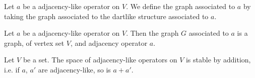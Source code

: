 \begin{definition}
  \label{def:graph_of_adjlike}
  Let $a$ be a adjacency-like operator on $V$.
  We define the graph associated to $a$ by taking the graph associated to the dartlike structure
  associated to $a$.
\end{definition}

\begin{lemma}
  \label{lem:adjacency_of_graph_of_adjacency}
  Let $a$ be a adjacency-like operator on $V$.
  Then the graph $G$ associated to $a$ is a graph, of vertex set $V$, and adjacency operator $a$.
\end{lemma}

\begin{lemma}
  \label{lem:adjlike_addition}
  Let $V$ be a set. The space of adjacency-like operators on $V$ is stable by addition, i.e.
  if $a$, $a'$ are adjacency-like, so is $a+a'$.
\end{lemma}
